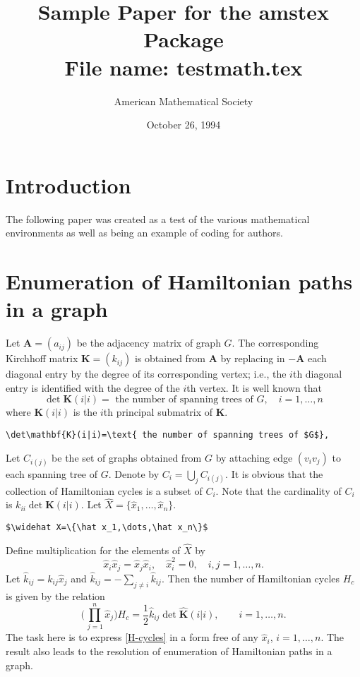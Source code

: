 \documentclass[draft]{amsart}
\newcommand{\ntt}{\normalfont\ttfamily}
\newcommand{\pkg}[1]{{\protect\ntt#1}}
\newcommand{\fn}[1]{{\protect\ntt#1}}
\theoremstyle{definition}
\theoremstyle{remark}
\begin{document}
\title[\pkg{amstex} Math Sample Paper]
{Sample Paper for the \pkg{amstex} Package\\
File name: \fn{testmath.tex}}
\author{American Mathematical Society}
\date{October 26, 1994}
\maketitle

\section{Introduction}
The following paper was created as a test of the various mathematical
environments as well as being an example of coding for authors.

\section{Enumeration of Hamiltonian paths in a graph}
Let $\mathbf{A}=(a_{ij})$ be the adjacency matrix of
graph $G$.
The corresponding Kirchhoff matrix $\mathbf{K}=(k_{ij})$ is obtained from
$\mathbf{A}$ by replacing in $-\mathbf{A}$ each diagonal entry by the degree of its
corresponding vertex; i.e., the $i$th diagonal entry is identified
with the degree of the $i$th vertex. It is well known that
\begin{equation}
\det\mathbf{K}(i|i)=\text{ the number of spanning trees of $G$},
\quad i=1,\dots,n
\end{equation}
where $\mathbf{K}(i|i)$ is the $i$th principal submatrix of $\mathbf{K}$.
\begin{verbatim}
\det\mathbf{K}(i|i)=\text{ the number of spanning trees of $G$},
\end{verbatim}

Let $C_{i(j)}$ be the set of graphs obtained from $G$ by attaching edge
$(v_iv_j)$ to each spanning tree of $G$. Denote by $C_i=\bigcup_j
C_{i(j)}$. It is obvious that the collection of Hamiltonian cycles is a
subset of $C_i$. Note that the cardinality of $C_i$ is $k_{ii}\det
\mathbf{K}(i|i)$. Let $\widehat X=\{\hat x_1,\dots,\hat x_n\}$.
\begin{verbatim}
$\widehat X=\{\hat x_1,\dots,\hat x_n\}$
\end{verbatim}
Define multiplication for the elements of $\widehat X$ by
\begin{equation}\label{multdef}
\hat x_i\hat x_j=\hat x_j\hat x_i,\quad \hat x^2_i=0,\quad
i,j=1,\dots,n.
\end{equation}
Let $\hat k_{ij}=k_{ij}\hat x_j$ and $\hat k_{ij}=-\sum_{j\not=i}
\hat k_{ij}$. Then the number of Hamiltonian cycles $H_c$ is given by the
relation \cite{liuchow:formalsum}
\begin{equation}\label{H-cycles}
\biggl(\prod^n_{\,j=1}\hat x_j\biggr)H_c=\frac{1}{2}\hat k_{ij}\det
\widehat{\mathbf{K}}(i|i),\qquad i=1,\dots,n.
\end{equation}
The task here is to express \eqref{H-cycles}
in a form free of any $\hat x_i$,
$i=1,\dots,n$. The result also leads to the resolution of enumeration of
Hamiltonian paths in a graph.
\end{document}
